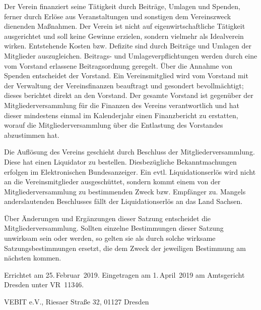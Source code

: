 \documentclass[fontsize=11pt,pagesize,parskip=half]{scrartcl}
\begin{document}
\begin{contract}
Der Verein finanziert seine Tätigkeit durch Beiträge, Umlagen und Spenden, ferner durch Erlöse aus Veranstaltungen und sonstigen dem Vereinszweck dienenden Maßnahmen.
Der Verein ist nicht auf eigenwirtschaftliche Tätigkeit ausgerichtet und soll keine Gewinne erzielen, sondern vielmehr als Idealverein wirken.
Entstehende Kosten bzw. Defizite sind durch Beiträge und Umlagen der Mitglieder auszugleichen.
Beitrags- und Umlageverpflichtungen werden durch eine vom Vorstand erlassene Beitragsordnung geregelt.
Über die Annahme von Spenden entscheidet der Vorstand.
Ein Vereinsmitglied wird vom Vorstand mit der Verwaltung der Vereinsfinanzen beauftragt und gesondert bevollmächtigt; dieses berichtet direkt an den Vorstand.
Der gesamte Vorstand ist gegenüber der Mitgliederversammlung für die Finanzen des Vereins verantwortlich und hat dieser mindestens einmal im Kalenderjahr einen Finanzbericht zu erstatten, worauf die Mitgliederversammlung über die Entlastung des Vorstandes abzustimmen hat.


Die Auflösung des Vereins geschieht durch Beschluss der Mitgliederversammlung.
Diese hat einen Liquidator zu bestellen.
Diesbezügliche Bekanntmachungen erfolgen im Elektronischen Bundesanzeiger.
Ein evtl. Liquidationserlös wird nicht an die Vereinsmitglieder ausgeschüttet, sondern kommt einem von der Mitgliederversammlung zu bestimmenden Zweck bzw. Empfänger zu.
Mangels anderslautenden Beschlusses fällt der Liquidationserlös an das Land Sachsen.


Über Änderungen und Ergänzungen dieser Satzung entscheidet die Mitgliederversammlung.
Sollten einzelne Bestimmungen dieser Satzung unwirksam sein oder werden, so gelten sie als durch solche wirksame Satzungsbestimmungen ersetzt, die dem Zweck der jeweiligen Bestimmung am nächsten kommen.

\end{contract}

\vfill
Errichtet am 25.\,Februar~2019. Eingetragen am 1.\,April~2019 am Amtsgericht Dresden unter VR~11346.

VEBIT e.V., Riesaer Straße 32, 01127 Dresden
\end{document}
